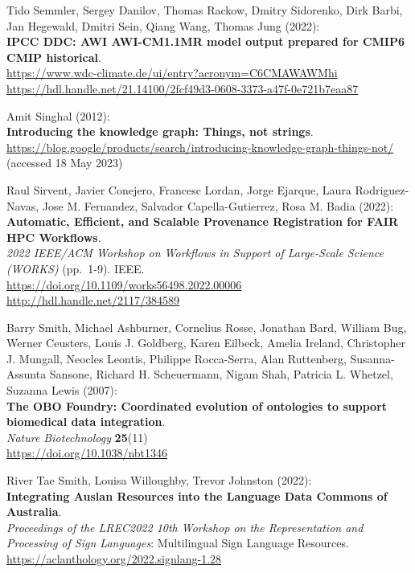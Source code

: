 \begin{thebibliography}{9}
Tido Semmler, Sergey Danilov, Thomas Rackow, Dmitry Sidorenko, Dirk
Barbi, Jan Hegewald, Dmitri Sein, Qiang Wang, Thomas Jung (2022):\\
\textbf{IPCC DDC: AWI AWI-CM1.1MR model output prepared for CMIP6 CMIP
historical}. \\
\url{https://www.wdc-climate.de/ui/entry?acronym=C6CMAWAWMhi}\\
\url{https://hdl.handle.net/21.14100/2fcf49d3-0608-3373-a47f-0e721b7eaa87}

Amit Singhal (2012): \\
\textbf{Introducing the knowledge graph: Things, not strings}.\\
\url{https://blog.google/products/search/introducing-knowledge-graph-things-not/}
(accessed 18 May 2023)

Raul Sirvent, Javier Conejero, Francesc Lordan, Jorge Ejarque, Laura Rodriguez-Navas, Jose M. Fernandez, Salvador Capella-Gutierrez, Rosa M. Badia (2022):\\
\textbf{Automatic, Efficient, and Scalable Provenance Registration for
FAIR HPC Workflows}.\\
\emph{2022 IEEE/ACM Workshop on Workflows in Support of Large-Scale Science (WORKS)} (pp.~1-9). IEEE.\\
\url{https://doi.org/10.1109/works56498.2022.00006}\\
\url{http://hdl.handle.net/2117/384589}

Barry Smith, Michael Ashburner, Cornelius Rosse, Jonathan Bard, William
Bug, Werner Ceusters, Louis J. Goldberg, Karen Eilbeck, Amelia Ireland,
Christopher J. Mungall, Neocles Leontis, Philippe Rocca-Serra, Alan
Ruttenberg, Susanna-Assunta Sansone, Richard H. Scheuermann, Nigam Shah,
Patricia L. Whetzel, Suzanna Lewis (2007): \\
\textbf{The {OBO Foundry}:
Coordinated evolution of ontologies to support biomedical data
integration}. \\
\emph{Nature Biotechnology} \textbf{25}(11) \\
\url{https://doi.org/10.1038/nbt1346}

River Tae Smith, Louisa Willoughby, Trevor Johnston (2022):\\
\textbf{Integrating Auslan Resources into the Language Data Commons of Australia}.\\
\emph{Proceedings of the LREC2022 10th Workshop on the Representation and Processing of Sign Languages}: Multilingual Sign Language Resources.\\
\url{https://aclanthology.org/2022.signlang-1.28}


\end{thebibliography}
